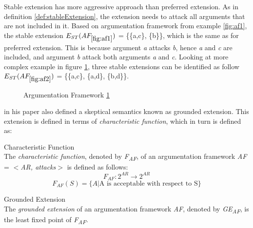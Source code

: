 Stable extension has more aggressive approach than preferred extension. As in definition \ref{def:stableExtension}, the extension needs to attack all arguments that are not included in it. Based on argumentation framework from example \ref{fig:af1}, the stable extension \textit{$E_{ST}(AF_{\ref{fig:af1}})$} = \{\{a,c\}, \{b\}\}, which is the same as for preferred extension. This is because argument \textit{a} attacks \textit{b}, hence \textit{a} and \textit{c} are included, and argument \textit{b} attack both arguments \textit{a} and \textit{c}. Looking at more complex example in figure \ref{fig:af2}, three stable extensions can be identified as follow \textit{$E_{ST}(AF_{\ref{fig:af2}})$} = \{\{a,c\}, \{a,d\}, \{b,d\}\}.

\begin{figure}[h]
\centering
{}
\caption{Argumentation Framework \ref{fig:af2}}
\label{fig:af2}
\end{figure}

\citet{dung1995} in his paper also defined a skeptical semantics known as grounded extension. This extension is defined in terms of \textit{characteristic function}, which in turn is defined as:

\begin{definition}{Characteristic Function}
\label{def:characteristicFunction}\\
The \textit{characteristic function}, denoted by \textit{F\textsubscript{AF}}, of an argumentation framework \textit{AF} = $<$\textit{AR, attacks}$>$ is defined as follows:
\[F_{AF}:2^{AR} \rightarrow 2^{AR}\]
\[F_{AF}(S)=\{A| \text{A is acceptable with respect to S} \}\]
\end{definition}

\begin{definition}{Grounded Extension}
\label{def:groundedExtension}\\
The \textit{grounded extension} of an argumentation framework \textit{AF}, denoted by \textit{GE\textsubscript{AF}}, is the least fixed point of \textit{F\textsubscript{AF}}.
\end{definition}

